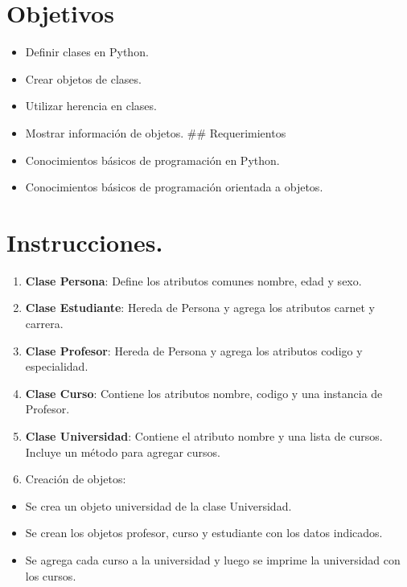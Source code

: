 \documentclass[
  a4paper,
  DIV=11,
  numbers=noendperiod,
  onepage,
  openany]{scrreprt}
\begin{document}
\section{Objetivos}\label{objetivos}

\begin{itemize}
\item
  Definir clases en Python.
\item
  Crear objetos de clases.
\item
  Utilizar herencia en clases.
\item
  Mostrar información de objetos. \#\# Requerimientos
\item
  Conocimientos básicos de programación en Python.
\item
  Conocimientos básicos de programación orientada a objetos.
\end{itemize}

\section{Instrucciones.}\label{instrucciones.}

\begin{enumerate}
\def\labelenumi{\arabic{enumi}.}
\item
  \textbf{Clase Persona}: Define los atributos comunes nombre, edad y
  sexo.
\item
  \textbf{Clase Estudiante}: Hereda de Persona y agrega los atributos
  carnet y carrera.
\item
  \textbf{Clase Profesor}: Hereda de Persona y agrega los atributos
  codigo y especialidad.
\item
  \textbf{Clase Curso}: Contiene los atributos nombre, codigo y una
  instancia de Profesor.
\item
  \textbf{Clase Universidad}: Contiene el atributo nombre y una lista de
  cursos. Incluye un método para agregar cursos.
\item
  Creación de objetos:
\end{enumerate}

\begin{itemize}
\item
  Se crea un objeto universidad de la clase Universidad.
\item
  Se crean los objetos profesor, curso y estudiante con los datos
  indicados.
\item
  Se agrega cada curso a la universidad y luego se imprime la
  universidad con los cursos.
\end{itemize}
\end{document}
